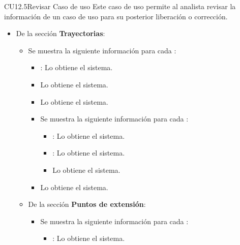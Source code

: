 \begin{UseCase}{CU12.5}{Revisar Caso de uso}{
		Este caso de uso permite al analista revisar la información de un caso de uso para su posterior liberación o corrección.
	}
{\begin{itemize}
\begin{itemize}
						\item Entradas: Lo obtiene el sistema.
						\item Salidas: Lo obtiene el sistema.
						\item {}: Lo obtiene el sistema.
						\item {}: Lo obtiene el sistema.
						\item {}: Lo obtiene el sistema.
					\end{itemize}
				\item De la sección \textbf{Trayectorias}:
					\begin{itemize}
						\item Se muestra la siguiente información para cada :
							\begin{itemize}
								\item {}: Lo obtiene el sistema.
								\item {} Lo obtiene el sistema.
								\item {} Lo obtiene el sistema.
								\item Se muestra la siguiente información para cada :
									\begin{itemize}
										\item {}: Lo obtiene el sistema.
										\item {}: Lo obtiene el sistema.
										\item {} Lo obtiene el sistema.
									\end{itemize}
								\item {} Lo obtiene el sistema.
							\end{itemize}
						\item De la sección \textbf{Puntos de extensión}:
							\begin{itemize}
								\item Se muestra la siguiente información para cada :
									\begin{itemize}
										\item {}: Lo obtiene el sistema.

\end{itemize}
\end{itemize}
\end{itemize}
\end{itemize}}
\end{UseCase}
